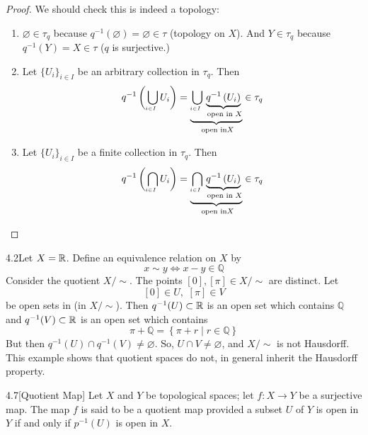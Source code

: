 \begin{proof}
We should check this is indeed a topology:
\begin{enumerate}
    \item[1.)] $\varnothing \in \tau_q$ because $q^{-1}(\varnothing) = \varnothing \in \tau$ (topology on $X$). And $Y \in \tau_q$ because $q^{-1}(Y) = X \in \tau$ ($q$ is surjective.)
    \item[2.)] Let $\{U_i\}_{i\in I}$ be an arbitrary collection in $\tau_q$. Then 
    $$q^{-1}\left(\underaccent{i \in I}{\bigcup}U_i\right) = \underbrace{\underaccent{i \in I}{\bigcup} \underbrace{q^{-1}\left(U_i\right)}_{\text{ open in }X}}_{\text{ open in} X} \in \tau_q$$
    \item[2.)] Let $\{U_i\}_{i\in I}$ be a finite collection in $\tau_q$. Then 
    $$q^{-1}\left(\underaccent{i \in I}{\bigcap}U_i\right) = \underbrace{\underaccent{i \in I}{\bigcap} \underbrace{q^{-1}\left(U_i\right)}_{\text{ open in }X}}_{\text{ open in} X} \in \tau_q$$
\end{enumerate}
\end{proof}

\begin{customexa}{4.2}Let $X = \mathbb{R}$. Define an equivalence relation on $X$ by
    $$x \sim y \iff x - y \in \mathbb{Q}$$
    Consider the quotient $X/\sim$. The points $[0], [\pi] \in X/\sim$ are distinct. Let
    $$[0] \in U, \,\, [\pi] \in V$$
    be open sets in (in $X/\sim$). Then $q^{-1}(U) \subset \mathbb{R}$ is an open set which contains $\mathbb{Q}$ and $q^{-1}(V) \subset \mathbb{R}$ is an open set which contains 
    $$\pi + \mathbb{Q} = \left\{\pi + r \mid r \in \mathbb{Q}\right\}$$
    But then $q^{-1}(U) \cap q^{-1}(V) \neq \varnothing$. So, $U \cap V \neq \varnothing$, and $X/\sim$ is not Hausdorff. This example shows that quotient spaces do not, in general inherit the Hausdorff property.
\end{customexa}

\begin{customdefinition}{4.7}[Quotient Map]
Let $X$ and $Y$ be topological spaces; let $f: X\longrightarrow Y$ be a surjective map. The map $f$ is said to be a quotient map provided a subset $U$ of $Y$ is open in $Y$ if and only if $p^{-1}(U)$ is open in $X$.
\end{customdefinition}

